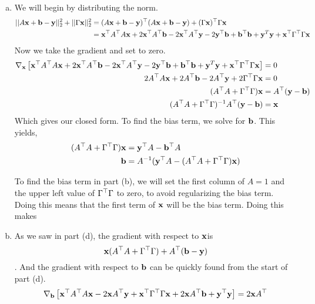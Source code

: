 \documentclass[12pt,letterpaper,fleqn]{hmcpset}
\begin{document}
\begin{enumerate}[(a)]
    \item
        We will begin by distributing the norm.
        \begin{align*}
            ||A{\bf x} + {\bf b} -{\bf y}||_2^2 + ||\Gamma{\bf x}||_2^2 &= (A{\bf x} + {\bf b} -{\bf y})^\top(A{\bf x} + {\bf b} -{\bf y}) + (\Gamma {\bf x})^\top \Gamma {\bf x}\\
            &= {\bf x}^\top A^\top A {\bf x} + 2 {\bf x}^\top A^\top {\bf b} - 2 {\bf x}^\top A^\top {\bf y} -2 {\bf y}^\top {\bf b} + {\bf b}^\top {\bf b} + {\bf y}^T {\bf y} + {\bf x}^\top \Gamma^\top \Gamma {\bf x}
        \end{align*}
        Now we take the gradient and set to zero.
        \begin{align*}
            \nabla_{\bf x} \left[ {\bf x}^\top A^\top A {\bf x} + 2 {\bf x}^\top A^\top {\bf b} - 2 {\bf x}^\top A^\top {\bf y} -2 {\bf y}^\top {\bf b} + {\bf b}^\top {\bf b} + {\bf y}^T {\bf y} + {\bf x}^\top \Gamma^\top \Gamma {\bf x} \right] &= 0\\
            2A^\top A {\bf x} + 2 A^\top {\bf b} - 2 A^\top {\bf y} + 2\Gamma^\top \Gamma {\bf x} &= 0 \\
            (A^\top A + \Gamma^\top \Gamma){\bf x} &= A^\top ({\bf y}  - {\bf b}) \\
            (A^\top A + \Gamma^\top \Gamma)^{-1}A^\top ({\bf y}  - {\bf b}) &= {\bf x}
        \end{align*}
        Which gives our closed form. To find the bias term, we solve for ${\bf b}$. This yields,
        \begin{align*}
            (A^\top A + \Gamma^\top \Gamma){\bf x} &= {\bf y}^\top A - {\bf b}^\top A \\
            {\bf b} &= A^{-1}({\bf y}^\top A - (A^\top A + \Gamma^\top \Gamma){\bf x})
        \end{align*}
        
        To find the bias term in part (b), we will set the first column of $A = 1$ and the upper left value of $\Gamma^\top \Gamma$ to zero, to avoid regularizing the bias term. Doing this means that the first term of ${\bf x}$ will be the bias term. Doing this makes 
    \item
        As we saw in part (d), the gradient with respect to ${\bf x} $is
            $$ {\bf x}(A^\top A + \Gamma^\top \Gamma) + A^\top( {\bf b} - {\bf y} )$$.
        And the gradient with respect to ${\bf b}$ can be quickly found from the start of part (d).
            $$\nabla_{\bf b} \left[ {\bf x}^\top A^\top A {\bf x} - 2 {\bf x} A^\top {\bf y} + {\bf x}^\top \Gamma^\top \Gamma {\bf x} + 2{\bf x} A^\top {\bf b} + {\bf y}^\top {\bf y} \right] = 2{\bf x} A^\top$$

\end{enumerate}


\newpage
\end{document}
